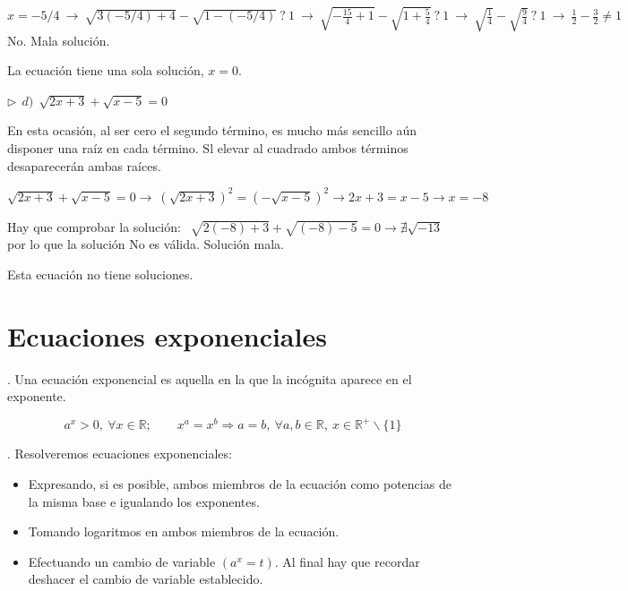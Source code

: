 \begin{miejercicio}
\vspace{2mm} $x=-5/4 \ \to \ \sqrt{3(-5/4)+4}-\sqrt{1-(-5/4)} \ ? \ 1 \ \to \ \sqrt{-\frac {15}{4}+1}-\sqrt{1+\frac 5 4}\ ? \ 1 \ \to \ \sqrt{\frac 1 4}-\sqrt{\frac 9 4 } \ ? \ 1 \ \to \ \frac 1 2 - \frac 3 2 \neq 1 \ $ No. Mala solución.

\vspace{2mm} \normalsize{La} ecuación tiene una sola solución, $x=0$.

\vspace{5mm} $\triangleright \ \ d)\ \ \sqrt{2x+3}+\sqrt{x-5}=0$
	
\vspace{2mm} En esta ocasión, al ser cero el segundo término, es mucho más sencillo aún disponer una raíz en cada término. Sl elevar al cuadrado ambos términos desaparecerán ambas raíces.

\vspace{2mm} $\sqrt{2x+3}+\sqrt{x-5}=0 \to \ (\sqrt{2x+3})^2=(-\sqrt{x-5})^2 \to 2x+3=x-5 \to x=-8$

\vspace{2mm} Hay que comprobar la solución: $\ \ \sqrt{2(-8)+3}+\sqrt{(-8)-5}=0 \to \nexists \sqrt{-13} \ $ por lo que la solución No es válida. Solución mala.

\vspace{2mm} Esta ecuación no tiene soluciones.
	
\end{miejercicio}


\vspace{1cm}
\section{Ecuaciones exponenciales}
\vspace{0.5cm}


\begin{definition}
. Una ecuación exponencial es aquella en la que la incógnita aparece en el exponente.

$$a^x>0,\ \forall x \in \mathbb R;\qquad x^a=x^b \Rightarrow a=b,\	 \forall a,b \in \mathbb R,\ x\in \mathbb R^+ \smallsetminus \{1\}$$
\end{definition}

\begin{theorem}
. Resolveremos ecuaciones exponenciales: 
\begin{itemize}
\item Expresando, si es posible, ambos miembros de la ecuación como potencias de la misma base e igualando los exponentes.
\item Tomando logaritmos en ambos miembros de la ecuación.
\item Efectuando un cambio de variable $(a^x=t)$. Al final hay que recordar deshacer el cambio de variable establecido.	
\end{itemize}
\end{theorem}

